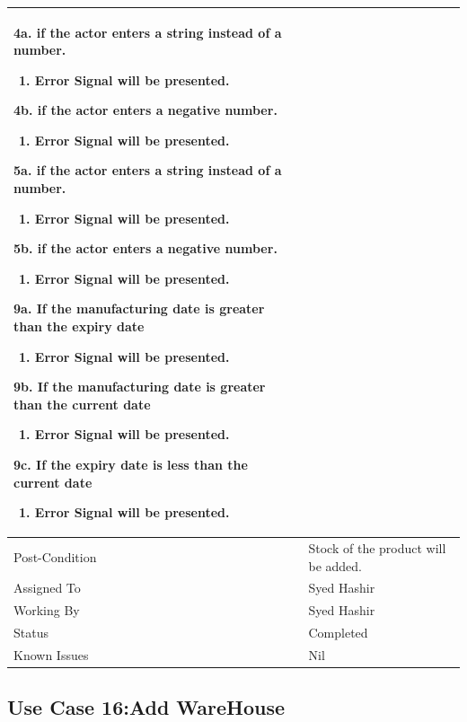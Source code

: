 \documentclass[12pt,a4paper]{article}
\begin{document}
\begin{longtable}{| p{3cm}|p{12cm}|}
4a. if the actor enters a string instead of a number.
 	\begin{enumerate}
		\item Error Signal will be presented.
	\end{enumerate}
4b. if the actor enters a negative number.
 	\begin{enumerate}
		\item Error Signal will be presented.
	\end{enumerate}
5a. if the actor enters a string instead of a number.
 	\begin{enumerate}
		\item Error Signal will be presented.
	\end{enumerate}
5b. if the actor enters a negative number.
 	\begin{enumerate}
		\item Error Signal will be presented.
	\end{enumerate}
9a. If the manufacturing date is greater than the expiry date
	\begin{enumerate}
		\item Error Signal will be presented.
	\end{enumerate}
9b. If the manufacturing date is greater than the current date
	\begin{enumerate}
		\item Error Signal will be presented.
	\end{enumerate}
9c. If the expiry date is less than the current date
	\begin{enumerate}
		\item Error Signal will be presented.
	\end{enumerate}
\\ \hline
Post-Condition &  Stock of the product will be added. \\ \hline
Assigned To &  Syed Hashir
\\ \hline
Working By &   Syed Hashir
\\ \hline
Status & 	Completed	
\\ \hline
Known Issues & Nil
\\\hline
\end{longtable}
\subsection{Use Case 16:Add WareHouse}
\end{document}
